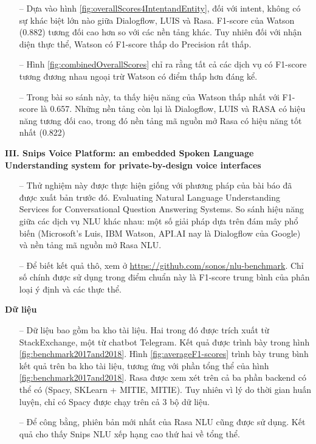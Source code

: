 \begin{itemize}
    \item[--] Dựa vào hình \ref{fig:overallScores4IntentandEntity}, đối với intent, không có sự khác biệt lớn nào giữa Dialogflow, LUIS và Rasa. F1-score của Watson (0.882) tương đối cao hơn so với các nền tảng khác. Tuy nhiên đối với nhận diện thực thể, Watson có F1-score thấp do Precision rất thấp.
    \item[--] Hình \ref{fig:combinedOverallScores} chỉ ra rằng tất cả các dịch vụ có F1-score tương đương nhau ngoại trừ Watson có điểm thấp hơn đáng kể.
    \item[--] Trong bài so sánh này, ta thấy hiệu năng của Watson thấp nhất với F1-score là 0.657. Những nền tảng còn lại là Dialogflow, LUIS và RASA có hiệu năng tương đối cao, trong đó nền tảng mã nguồn mở Rasa có hiệu năng tốt nhất (0.822)
\end{itemize}

\textbf{III. Snips Voice Platform: an embedded Spoken Language Understanding system for private-by-design voice interfaces}

\begin{itemize}
    \item[--] Thử nghiệm này được thực hiện giống với phương pháp của bài báo đã được xuất bản trước đó. Evaluating Natural Language Understanding Services for Conversational Question Answering Systems. So sánh hiệu năng giữa các dịch vụ NLU khác nhau: một số giải pháp dựa trên đám mây phổ biến (Microsoft’s Luis, IBM Watson, API.AI nay là Dialogflow của Google) và nền tảng mã nguồn mở Rasa NLU.
    \item[--] Để biết kết quả thô, xem ở \url{https://github.com/sonos/nlu-benchmark}. Chỉ số chính được sử dụng trong điểm chuẩn này là F1-score trung bình của phân loại ý định và các thực thể.
\end{itemize}

\textbf{Dữ liệu}
\begin{itemize}
    \item[--] Dữ liệu bao gồm ba kho tài liệu. Hai trong đó được trích xuất từ StackExchange, một từ chatbot Telegram. Kết quả được trình bày trong hình \ref{fig:benchmark2017and2018}. Hình \ref{fig:averageF1-scores} trình bày trung bình kết quả trên ba kho tài liệu, tương ứng với phần tổng thể của hình \ref{fig:benchmark2017and2018}. Rasa được xem xét trên cả ba phần backend có thể có (Spacy, SKLearn + MITIE, MITIE). Tuy nhiên vì lý do thời gian huấn luyện, chỉ có Spacy được chạy trên cả 3 bộ dữ liệu.
    \item[--] Để công bằng, phiên bản mới nhất của Rasa NLU cũng được sử dụng. Kết quả cho thấy Snips NLU xếp hạng cao thứ hai về tổng thể.
\end{itemize}


